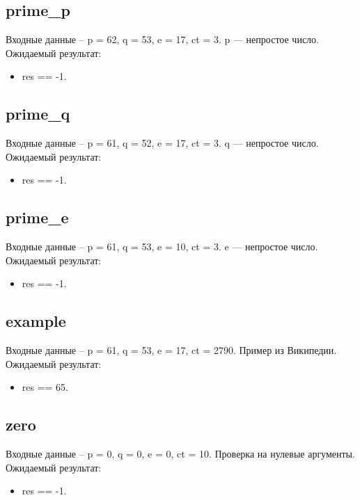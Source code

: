 \documentclass{article}
\begin{document}
\subsection{prime\_p}
Входные данные -- p = 62, q = 53, e = 17, ct = 3. p --- непростое число.\\
Ожидаемый результат: 
\begin{itemize}
    \item res == -1. 
\end{itemize}

\subsection{prime\_q}
Входные данные -- p = 61, q = 52, e = 17, ct = 3. q --- непростое число.\\
Ожидаемый результат: 
\begin{itemize}
    \item res == -1. 
\end{itemize}

\subsection{prime\_e}
Входные данные -- p = 61, q = 53, e = 10, ct = 3. e --- непростое число.\\
Ожидаемый результат: 
\begin{itemize}
    \item res == -1. 
\end{itemize}

\subsection{example}
Входные данные -- p = 61, q = 53, e = 17, ct = 2790. Пример из Википедии.\\
Ожидаемый результат: 
\begin{itemize}
    \item res == 65. 
\end{itemize}

\subsection{zero}
Входные данные -- p = 0, q = 0, e = 0, ct = 10. Проверка на нулевые аргументы.\\
Ожидаемый результат: 
\begin{itemize}
    \item res == -1. 
\end{itemize}
\end{document}
